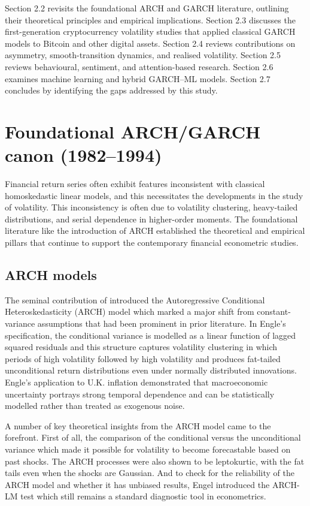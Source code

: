 \documentclass[12pt]{report}
\begin{document}
Section 2.2 revisits the foundational ARCH and GARCH literature, outlining their theoretical principles and empirical implications. Section 2.3 discusses the first-generation cryptocurrency volatility studies that applied classical GARCH models to Bitcoin and other digital assets. Section 2.4 reviews contributions on asymmetry, smooth-transition dynamics, and realised volatility. Section 2.5 reviews behavioural, sentiment, and attention-based research. Section 2.6 examines machine learning and hybrid GARCH–ML models. Section 2.7 concludes by identifying the gaps addressed by this study.

\section{Foundational ARCH/GARCH canon (1982–1994)}
Financial return series often exhibit features inconsistent with classical homoskedastic linear models, and this necessitates the developments in the study of volatility. This inconsistency is often due to volatility clustering, heavy-tailed distributions, and serial dependence in higher-order moments. The foundational literature like the introduction of ARCH established the theoretical and empirical pillars that continue to support the contemporary financial econometric studies.

\subsection{ARCH models}

The seminal contribution of \cite{engle1982arch} introduced the Autoregressive Conditional Heteroskedasticity (ARCH) model which marked a major shift from constant-variance assumptions that had been prominent in prior literature. In Engle’s specification, the conditional variance is modelled as a linear function of lagged squared residuals and this structure captures volatility clustering in which periods of high volatility followed by high volatility and produces fat-tailed unconditional return distributions even under normally distributed innovations. Engle’s application to U.K. inflation demonstrated that macroeconomic uncertainty portrays strong temporal dependence and can be statistically modelled rather than treated as exogenous noise.

A number of key theoretical insights from the ARCH model came to the forefront. First of all, the comparison of the conditional versus the unconditional variance which made it possible for volatility to become forecastable based on past shocks. The ARCH processes were also shown to be leptokurtic, with the fat tails even when the shocks are Gaussian. And to check for the reliability of the ARCH model and whether it has unbiased results, Engel introduced the ARCH-LM test which still remains a standard diagnostic tool in econometrics.
\end{document}
